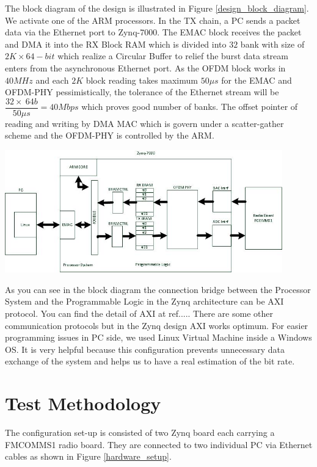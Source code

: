 The block diagram of the design is illustrated in Figure \ref{design_block_diagram}. We activate one of the ARM processors. In the TX chain, a PC sends a packet data via the Ethernet port to Zynq-7000. The EMAC block receives the packet and DMA it into the RX Block RAM which is divided into $32$ bank with size of $2K \times 64-bit$ which realize a Circular Buffer to relief the burst data stream enters from the asynchronous Ethernet port. As the OFDM block works in $40 MHz$ and each $2K$ block reading takes maximum $50\mu s$ for the EMAC and OFDM-PHY pessimistically, the tolerance of the Ethernet stream will be $\dfrac{32 \times \ 64b}{50\mu s} = 40Mbps$ which proves good number of banks. The offset pointer of reading and writing by DMA MAC which is govern under a scatter-gather scheme and the OFDM-PHY is controlled by the ARM.\\

\begin{center}
\includegraphics[width=12cm]{content/fig/fpga_internal.JPG}
\label{design_block_diagram}
\end{center}

As you can see in the block diagram the connection bridge between the Processor System and the Programmable Logic in the Zynq architecture can be AXI protocol. You can find the detail of AXI at ref..... There are some other communication protocols but in the Zynq design AXI works optimum.
For easier programming issues in PC side, we used Linux Virtual Machine inside a Windows OS. It is very helpful because this configuration prevents unnecessary data exchange of the system and helps us to have a real estimation of the bit rate.\\

\section{Test Methodology}
The configuration set-up is consisted of two Zynq board each carrying a FMCOMMS1 radio board. They are connected to two individual PC via Ethernet cables as shown in Figure \ref{hardware_setup}.\\

